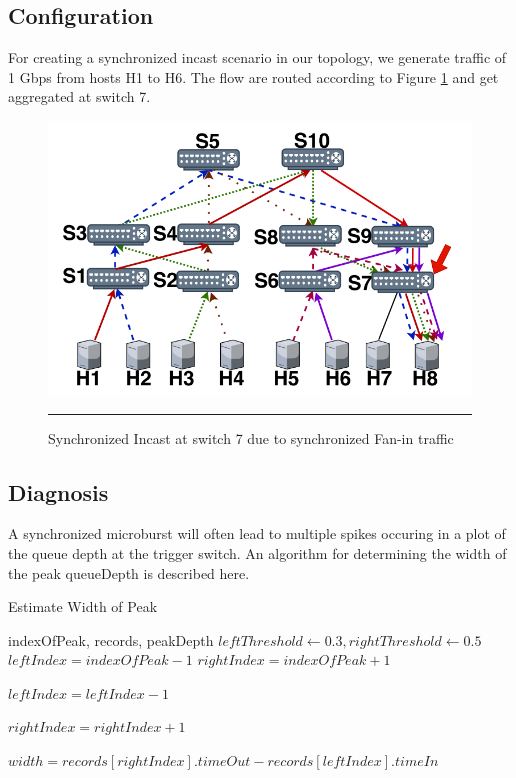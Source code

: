 \subsection{Configuration}
For creating a synchronized incast scenario in our topology, we generate traffic of 1 Gbps from hosts H1 to H6. The flow are routed
according to Figure \ref{fig:Synch Incast Topo} and get aggregated at switch 7.
\begin{figure}[htbp]
	\centering
		\includegraphics[width=0.65\columnwidth]{Figures/sync_incast_topo.png}
		\rule{35em}{0.5pt}
	\caption[Synchronized Incast Flows]{Synchronized Incast at switch 7 due to synchronized Fan-in traffic}
	\label{fig:Synch Incast Topo}
\end{figure}


\subsection{Diagnosis}
A synchronized microburst will often lead to multiple spikes occuring in a plot 
of the queue depth at the trigger switch. An algorithm for determining the width of
the peak queueDepth is described here.

\begin{algorithm}
	\caption{Estimate Width of Peak}
	\begin{algorithmic}[1]
		\REQUIRE indexOfPeak, records, peakDepth
		\STATE $leftThreshold \leftarrow 0.3, rightThreshold \leftarrow 0.5$
		\STATE $leftIndex = indexOfPeak - 1$
		\STATE $rightIndex = indexOfPeak + 1$
		
		\STATE $leftIndex = leftIndex - 1$
		\ENDWHILE

		\STATE $rightIndex = rightIndex + 1$
		\ENDWHILE

		\STATE $width = records[rightIndex].timeOut - records[leftIndex].timeIn$
	\end{algorithmic}
\end{algorithm}

